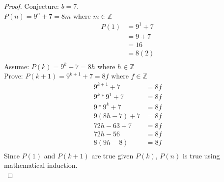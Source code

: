 \documentclass[a4paper]{article}
\begin{document}
\begin{proof}
Conjecture: $b = 7$. \\
$P(n) = 9^n + 7 = 8m$ where $ m \in \mathbb{Z}$\\
\begin{align*}
P(1) &= 9^1 +7\\
&= 9 + 7\\ 
&= 16 \\
&= 8(2)\\
\end{align*}
\linebreak\linebreak\linebreak\linebreak\linebreak\linebreak\linebreak\linebreak
Assume: $ P(k) = 9^k + 7 = 8h$ where $ h \in \mathbb{Z}$\\
Prove: $P(k+1) = 9^{k+1} + 7 = 8f$ where $f \in \mathbb{Z}$\\
\begin{align*}
9^{k+1} + 7 &= 8f\\
9^k * 9^1 + 7 &= 8f\\
9*9^k + 7 &= 8f \\
9(8h-7) + 7 &= 8f \tag*{Substituting from P(k)}\\
72h - 63 + 7 &= 8f\\
72h - 56 &= 8f\\
8(9h -8) &= 8f\\
\end{align*}
Since $P(1)$ and $P(k+1)$ are true given $P(k)$, $P(n)$ is true using mathematical induction. \\ 

\end{proof}
\end{document}
